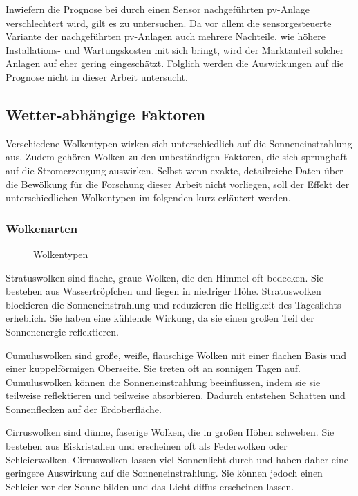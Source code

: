 \documentclass[12pt, a4paper]{article}
\begin{document}
Inwiefern die Prognose bei durch einen Sensor nachgeführten \ac{pv}-Anlage verschlechtert wird, gilt es zu untersuchen. Da vor allem die sensorgesteuerte Variante der nachgeführten \ac{pv}-Anlagen auch mehrere Nachteile, wie höhere Installations- und Wartungskosten mit sich bringt, wird der Marktanteil solcher Anlagen auf eher gering eingeschätzt. Folglich werden die Auswirkungen auf die Prognose nicht in dieser Arbeit untersucht.

\subsection{Wetter-abhängige Faktoren}

Verschiedene Wolkentypen wirken sich unterschiedlich auf die Sonneneinstrahlung aus. Zudem gehören Wolken zu den unbeständigen Faktoren, die sich sprunghaft auf die Stromerzeugung auswirken. Selbst wenn exakte, detailreiche Daten über die Bewölkung für die Forschung dieser Arbeit nicht vorliegen, soll der Effekt der unterschiedlichen Wolkentypen im folgenden kurz erläutert werden.

\subsubsection{Wolkenarten}
\label{subsubsec:clouds}

\begin{figure}
\centering
\def\svgwidth{400pt}

\caption{Wolkentypen}
\label{wolkentypen}
\end{figure}


Stratuswolken sind flache, graue Wolken, die den Himmel oft bedecken. Sie bestehen aus Wassertröpfchen und liegen in niedriger Höhe. Stratuswolken blockieren die Sonneneinstrahlung und reduzieren die Helligkeit des Tageslichts erheblich. Sie haben eine kühlende Wirkung, da sie einen großen Teil der Sonnenenergie reflektieren.

Cumuluswolken sind große, weiße, flauschige Wolken mit einer flachen Basis und einer kuppelförmigen Oberseite. Sie treten oft an sonnigen Tagen auf. Cumuluswolken können die Sonneneinstrahlung beeinflussen, indem sie sie teilweise reflektieren und teilweise absorbieren. Dadurch entstehen Schatten und Sonnenflecken auf der Erdoberfläche.

Cirruswolken sind dünne, faserige Wolken, die in großen Höhen schweben. Sie bestehen aus Eiskristallen und erscheinen oft als Federwolken oder Schleierwolken. Cirruswolken lassen viel Sonnenlicht durch und haben daher eine geringere Auswirkung auf die Sonneneinstrahlung. Sie können jedoch einen Schleier vor der Sonne bilden und das Licht diffus erscheinen lassen.
\end{document}
